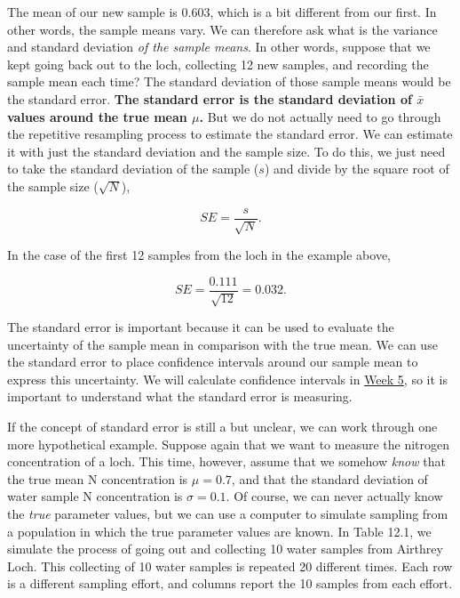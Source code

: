 \documentclass[
]{scrbook}
\begin{document}
The mean of our new sample is 0.603, which is a bit different from our first.
In other words, the sample means vary.
We can therefore ask what is the variance and standard deviation \emph{of the sample means}.
In other words, suppose that we kept going back out to the loch, collecting 12 new samples, and recording the sample mean each time?
The standard deviation of those sample means would be the standard error.
\textbf{The standard error is the standard deviation of \(\bar{x}\) values around the true mean \(\mu\).}
But we do not actually need to go through the repetitive resampling process to estimate the standard error.
We can estimate it with just the standard deviation and the sample size.
To do this, we just need to take the standard deviation of the sample (\(s\)) and divide by the square root of the sample size (\(\sqrt{N}\)),

\[SE = \frac{s}{\sqrt{N}}.\]

In the case of the first 12 samples from the loch in the example above,

\[SE = \frac{0.111}{\sqrt{12}} = 0.032.\]

The standard error is important because it can be used to evaluate the uncertainty of the sample mean in comparison with the true mean.
We can use the standard error to place confidence intervals around our sample mean to express this uncertainty.
We will calculate confidence intervals in \protect\hyperlink{Week5}{Week 5}, so it is important to understand what the standard error is measuring.

If the concept of standard error is still a but unclear, we can work through one more hypothetical example.
Suppose again that we want to measure the nitrogen concentration of a loch.
This time, however, assume that we somehow \emph{know} that the true mean N concentration is \(\mu = 0.7\), and that the standard deviation of water sample N concentration is \(\sigma = 0.1\).
Of course, we can never actually know the \emph{true} parameter values, but we can use a computer to simulate sampling from a population in which the true parameter values are known.
In Table 12.1, we simulate the process of going out and collecting 10 water samples from Airthrey Loch.
This collecting of 10 water samples is repeated 20 different times.
Each row is a different sampling effort, and columns report the 10 samples from each effort.
\end{document}
